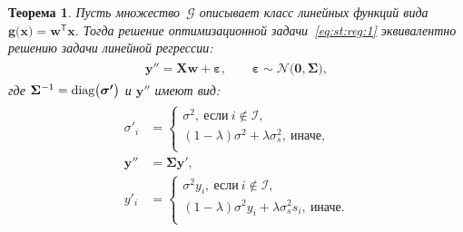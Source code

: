 \documentclass{dissert}
\newtheorem{theorem}{Теорема}
\begin{document}
\begin{theorem}
\label{theorem:st:reg}
Пусть множество~$\mathcal{G}$ описывает класс линейных функций вида~$\mathbf{g}\bigr(\mathbf{x}\bigr) = \mathbf{w}^{\mathsf{T}}\mathbf{x}.$ Тогда решение оптимизационной задачи~\eqref{eq:st:reg:1} эквивалентно решению задачи линейной регрессии:
\begin{gather}
\label{eq:st:reg:th:st:1}
\begin{aligned}
\mathbf{y''} = \mathbf{X}\mathbf{w} + \bm{\varepsilon},\qquad \bm{\varepsilon} \sim \mathcal{N}\bigr(\mathbf{0}, \bm{\Sigma}\bigr),
\end{aligned}
\end{gather}
где $\bm{\Sigma}^{-1}={\text{\normalfont{diag}}}\bigr(\bm{\sigma'}\bigr)$ и $\mathbf{y''}$ имеют вид:
\begin{gather}
\label{eq:st:reg:th:st:2}
\begin{aligned}
\sigma'_{i} &= \begin{cases}
\sigma^2,~\text{если}~i \not \in \mathcal{I},\\
\left(1-\lambda\right)\sigma^2+\lambda\sigma_s^2,~\text{иначе},\\
\end{cases}\\
\mathbf{y''} &= \bm{\Sigma}\mathbf{y'},\\
y'_i &= \begin{cases}
\sigma^2y_i,~\text{если}~i \not \in \mathcal{I},\\
\left(1-\lambda\right)\sigma^2y_i+\lambda\sigma_s^2s_i,~\text{иначе}.\\
\end{cases}
\end{aligned}
\end{gather}
\end{theorem}
\end{document}
